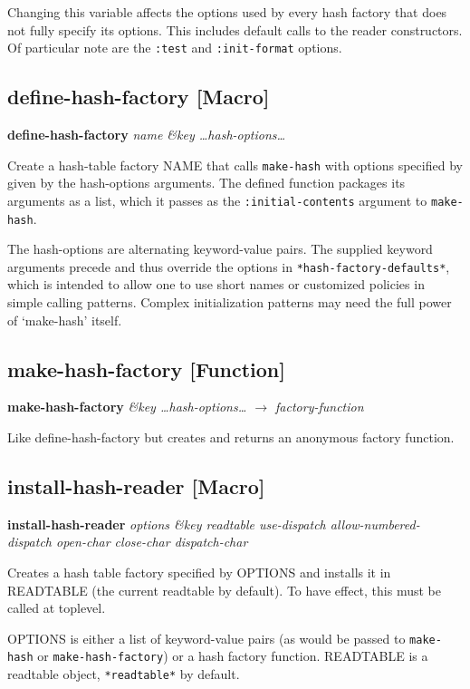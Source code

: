 \documentclass[11pt]{article}
\begin{document}
   Changing this variable affects the options used by every hash factory
   that does not fully specify its options. This includes default calls to
   the reader constructors. Of particular note are the \texttt{:test} and
   \texttt{:init-format} options.
\subsection{define-hash-factory [Macro]}
\label{sec-9-6}


   \textbf{define-hash-factory} \emph{name \&key \ldots{}hash-options\ldots{}}

   Create a hash-table factory NAME that calls \texttt{make-hash} with options
   specified by given by the hash-options arguments. The defined
   function packages its arguments as a list, which it passes as
   the \texttt{:initial-contents} argument to \texttt{make-hash}.

   The hash-options are alternating keyword-value pairs. The supplied
   keyword arguments precede and thus override the options in
   \texttt{*hash-factory-defaults*}, which is intended to allow one to use short
   names or customized policies in simple calling patterns. Complex
   initialization patterns may need the full power of `make-hash'
   itself.
\subsection{make-hash-factory [Function]}
\label{sec-9-7}


   \textbf{make-hash-factory} \emph{&key \ldots{}hash-options\ldots{} $\to$ factory-function}

   Like define-hash-factory but creates and returns an anonymous factory
   function.
\subsection{install-hash-reader [Macro]}
\label{sec-9-8}


   \textbf{install-hash-reader} \emph{options \&key readtable use-dispatch allow-numbered-dispatch open-char close-char dispatch-char}  

   Creates a hash table factory specified by OPTIONS and installs it
   in READTABLE (the current readtable by default). To have effect,
   this must be called at toplevel.

   OPTIONS is either a list of keyword-value pairs (as would be passed to
   \texttt{make-hash} or \texttt{make-hash-factory}) or a hash factory function.
   READTABLE is a readtable object, \texttt{*readtable*} by default.
\end{document}
